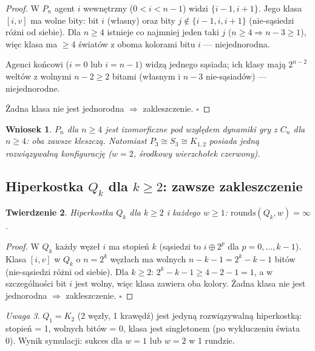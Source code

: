 \documentclass[12pt,a4paper]{article}
\theoremstyle{plain}
\newtheorem{theorem}{Twierdzenie}[section]
\newtheorem{corollary}[theorem]{Wniosek}
\theoremstyle{definition}
\theoremstyle{remark}
\newtheorem{remark}[theorem]{Uwaga}
\newcommand{\rounds}{\mathrm{rounds}}
\begin{document}
\begin{proof}
W $P_n$ agent $i$ wewnętrzny ($0 < i < n{-}1$) widzi $\{i{-}1, i{+}1\}$. Jego klasa $[i,v]$ ma wolne bity: bit $i$ (własny) oraz bity $j \notin \{i{-}1,i,i{+}1\}$ (nie-sąsiedzi różni od siebie). Dla $n \ge 4$ istnieje co najmniej jeden taki $j$ ($n \ge 4 \Rightarrow n-3 \ge 1$), więc klasa ma $\ge 4$ światów z oboma kolorami bitu $i$ — niejednorodna.

Agenci końcowi ($i = 0$ lub $i = n{-}1$) widzą jednego sąsiada; ich klasy mają $2^{n-2}$ weltów z wolnymi $n-2 \ge 2$ bitami (własnym i $n-3$ nie-sąsiadów) — niejednorodne.

Żadna klasa nie jest jednorodna $\Rightarrow$ zakleszczenie. $\square$
\end{proof}

\begin{corollary}
$P_n$ dla $n \ge 4$ jest izomorficzne pod względem dynamiki gry z $C_n$ dla $n \ge 4$: oba zawsze kleszczą. Natomiast $P_3 \cong S_3 \cong K_{1,2}$ posiada jedną rozwiązywalną konfigurację ($w = 2$, środkowy wierzchołek czerwony).
\end{corollary}

\subsection{Hiperkostka $Q_k$ dla $k \ge 2$: zawsze zakleszczenie}
\label{sec:hypercube}

\begin{theorem}
\label{thm:hypercube}
Hiperkostka $Q_k$ dla $k \ge 2$ i każdego $w \ge 1$: $\rounds(Q_k,w) = \infty$.
\end{theorem}

\begin{proof}
W $Q_k$ każdy węzeł $i$ ma stopień $k$ (sąsiedzi to $i \oplus 2^p$ dla $p = 0,\ldots,k{-}1$). Klasa $[i,v]$ w $Q_k$ o $n = 2^k$ węzłach ma wolnych $n - k - 1 = 2^k - k - 1$ bitów (nie-sąsiedzi różni od siebie). Dla $k \ge 2$: $2^k - k - 1 \ge 4 - 2 - 1 = 1$, a w szczególności bit $i$ jest wolny, więc klasa zawiera oba kolory. Żadna klasa nie jest jednorodna $\Rightarrow$ zakleszczenie. $\square$
\end{proof}

\begin{remark}
$Q_1 = K_2$ (2 węzły, 1 krawędź) jest jedyną rozwiązywalną hiperkostką: stopień = 1, wolnych bitów = 0, klasa jest singletonem (po wykluczeniu świata 0). Wynik symulacji: sukces dla $w = 1$ lub $w = 2$ w 1 rundzie.
\end{remark}
\end{document}
